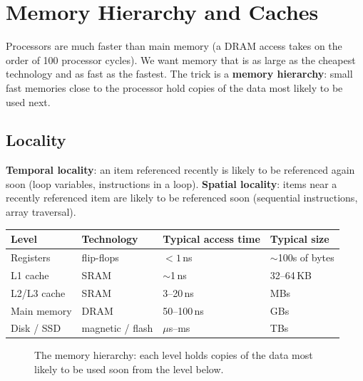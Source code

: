 \chapter{Memory Hierarchy and Caches}

Processors are much faster than main memory (a DRAM access takes on the
order of 100 processor cycles). We want memory that is as large as the
cheapest technology and as fast as the fastest. The trick is a
\textbf{memory hierarchy}: small fast memories close to the processor hold
copies of the data most likely to be used next.

\section{Locality}

\begin{definition}
\textbf{Temporal locality}: an item referenced recently is likely to be
referenced again soon (loop variables, instructions in a loop).
\textbf{Spatial locality}: items near a recently referenced item are likely
to be referenced soon (sequential instructions, array traversal).
\end{definition}

\begin{center}
\begin{tabular}{llll}
\toprule
Level & Technology & Typical access time & Typical size \\
\midrule
Registers & flip-flops & $<1$\,ns & $\sim$100s of bytes \\
L1 cache & SRAM & $\sim$1\,ns & 32--64\,KB \\
L2/L3 cache & SRAM & 3--20\,ns & MBs \\
Main memory & DRAM & 50--100\,ns & GBs \\
Disk / SSD & magnetic / flash & $\mu$s--ms & TBs \\
\bottomrule
\end{tabular}
\end{center}

\begin{figure}[H]
\centering
{}
\caption{The memory hierarchy: each level holds copies of the data most
likely to be used soon from the level below.}
\end{figure}

